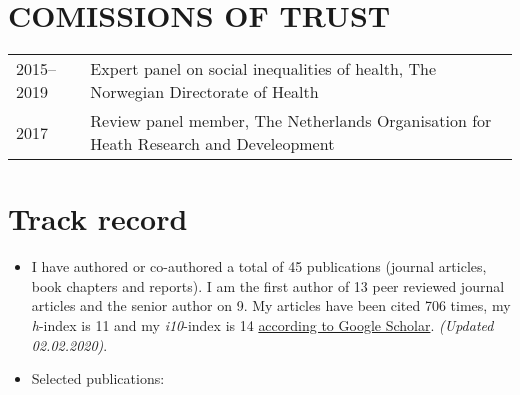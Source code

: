 \documentclass[11pt,a4paper,a4paper]{article}
\providecommand{\tightlist}{%
  \setlength{\itemsep}{0pt}\setlength{\parskip}{0pt}}
\newcounter{papers}
\begin{document}
\hypertarget{comissions-of-trust}{%
\section{COMISSIONS OF TRUST}\label{comissions-of-trust}}

\begin{tabular}{ll}
  2015--2019 & Expert panel on social inequalities of health, The Norwegian Directorate of Health \\ 
  2017 & Review panel member, The Netherlands Organisation for Heath Research and Develeopment \\ 
  \end{tabular}

\hypertarget{track-record}{%
\section{Track record}\label{track-record}}

\begin{itemize}
\tightlist
\item
  I have authored or co-authored a total of 45 publications (journal articles, book chapters and reports). I am the first author of 13 peer reviewed journal articles and the senior author on 9. My articles have been cited 706 times, my \emph{h}-index is 11 and my \emph{i10}-index is 14 \href{https://scholar.google.com/citations?user=TMC38ZgAAAAJ\&hl=en}{according to Google Scholar}. \emph{(Updated 02.02.2020)}.
\item
  Selected publications:
  \newrefcontext[sorting=none]\setcounter{papers}{0}\pagebreak[3]\printbibliography[category=bib-/Users/st06810/Dropbox/AkademiskCV/tpubs_zot.bib-4904309,heading=none]\setcounter{papers}{0}
\end{itemize}

\nocite{BoeSocioeconomicstatuschildren2012,
BoeSocioeconomicstatuschild2014,
BoeInterplaySubjectiveObjective2019a,
BoeCumulativeeffectsnegative2017,
BoeEconomicvolatilitychildhood2017,
Arntzen29recommendationscombat2019,
BoeFinancialdifficultieschildhood2017,
Boestrengthsdifficultiesquestionnaire2016,
SmidMeasurementEquivalenceConvergent2018,
BoeSosiookonomiskstatusog2015}
\end{document}
